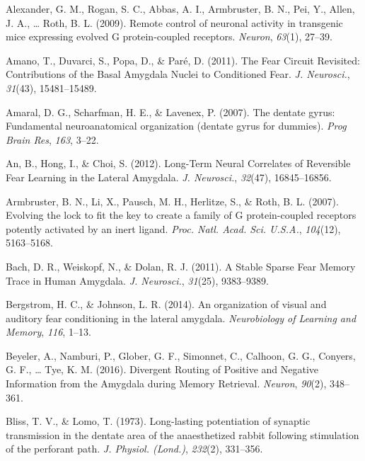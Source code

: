 \documentclass[12pt,a4paperpaper,]{report}
\begin{document}
\hypertarget{ref-alexanderux5fremoteux5f2009}{}
Alexander, G. M., Rogan, S. C., Abbas, A. I., Armbruster, B. N., Pei,
Y., Allen, J. A., \ldots{} Roth, B. L. (2009). Remote control of
neuronal activity in transgenic mice expressing evolved G
protein-coupled receptors. \emph{Neuron}, \emph{63}(1), 27--39.

\hypertarget{ref-amanoux5ffearux5f2011-1}{}
Amano, T., Duvarci, S., Popa, D., \& Paré, D. (2011). The Fear Circuit
Revisited: Contributions of the Basal Amygdala Nuclei to Conditioned
Fear. \emph{J. Neurosci.}, \emph{31}(43), 15481--15489.

\hypertarget{ref-amaralux5fdentateux5f2007}{}
Amaral, D. G., Scharfman, H. E., \& Lavenex, P. (2007). The dentate
gyrus: Fundamental neuroanatomical organization (dentate gyrus for
dummies). \emph{Prog Brain Res}, \emph{163}, 3--22.

\hypertarget{ref-anux5flong-termux5f2012}{}
An, B., Hong, I., \& Choi, S. (2012). Long-Term Neural Correlates of
Reversible Fear Learning in the Lateral Amygdala. \emph{J. Neurosci.},
\emph{32}(47), 16845--16856.

\hypertarget{ref-armbrusterux5fevolvingux5f2007}{}
Armbruster, B. N., Li, X., Pausch, M. H., Herlitze, S., \& Roth, B. L.
(2007). Evolving the lock to fit the key to create a family of G
protein-coupled receptors potently activated by an inert ligand.
\emph{Proc. Natl. Acad. Sci. U.S.A.}, \emph{104}(12), 5163--5168.

\hypertarget{ref-bachux5fstableux5f2011}{}
Bach, D. R., Weiskopf, N., \& Dolan, R. J. (2011). A Stable Sparse Fear
Memory Trace in Human Amygdala. \emph{J. Neurosci.}, \emph{31}(25),
9383--9389.

\hypertarget{ref-bergstromux5forganizationux5f2014}{}
Bergstrom, H. C., \& Johnson, L. R. (2014). An organization of visual
and auditory fear conditioning in the lateral amygdala.
\emph{Neurobiology of Learning and Memory}, \emph{116}, 1--13.

\hypertarget{ref-beyelerux5fdivergentux5f2016}{}
Beyeler, A., Namburi, P., Glober, G. F., Simonnet, C., Calhoon, G. G.,
Conyers, G. F., \ldots{} Tye, K. M. (2016). Divergent Routing of
Positive and Negative Information from the Amygdala during Memory
Retrieval. \emph{Neuron}, \emph{90}(2), 348--361.

\hypertarget{ref-blissux5flong-lastingux5f1973}{}
Bliss, T. V., \& Lomo, T. (1973). Long-lasting potentiation of synaptic
transmission in the dentate area of the anaesthetized rabbit following
stimulation of the perforant path. \emph{J. Physiol. (Lond.)},
\emph{232}(2), 331--356.
\end{document}
